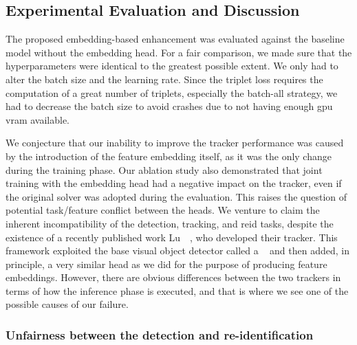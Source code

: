 \subsection{Experimental Evaluation and Discussion}

The proposed embedding-based enhancement was evaluated against the baseline model without the embedding head. For a fair comparison, we made sure that the hyperparameters were identical to the greatest possible extent. We only had to alter the batch size and the learning rate. Since the triplet loss requires the computation of a great number of triplets, especially the batch-all strategy, we had to decrease the batch size to avoid crashes due to not having enough \gls{gpu} \gls{vram} available.


We conjecture that our inability to improve the tracker performance was caused by the introduction of the feature embedding itself, as it was the only change during the training phase. Our ablation study also demonstrated that joint training with the embedding head had a negative impact on the tracker, even if the original solver was adopted during the evaluation. This raises the question of potential task/feature conflict between the heads. We venture to claim the inherent incompatibility of the detection, tracking, and \gls{reid} tasks, despite the existence of a recently published work Lu~\etal{}~\cite{lu2020retinatrack}, who developed their \retinatrack{} tracker. This framework exploited the base visual object detector called a \retinanet{}~\cite{lin2018focal} and then added, in principle, a very similar head as we did for the purpose of producing feature embeddings. However, there are obvious differences between the two trackers in terms of how the inference phase is executed, and that is where we see one of the possible causes of our failure.

\subsubsection{Unfairness between the detection and re-identification}

